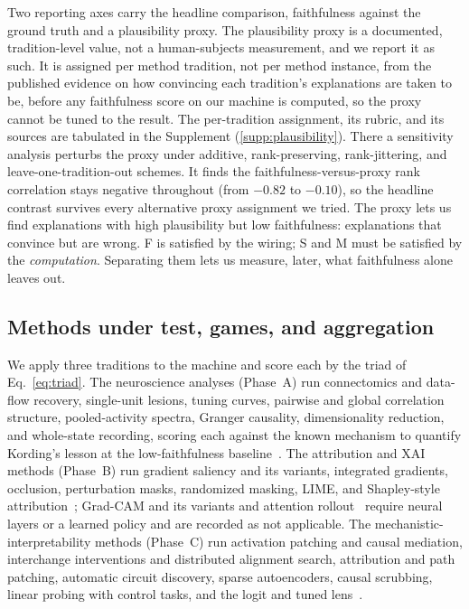 Two reporting axes carry the headline comparison, faithfulness against the ground truth and a
plausibility proxy. The plausibility proxy is a documented, tradition-level value, not a
human-subjects measurement, and we report it as such. It is assigned per method tradition, not
per method instance, from the published evidence on how convincing each tradition's
explanations are taken to be, before any faithfulness score on our machine is computed, so the
proxy cannot be tuned to the result. The per-tradition assignment, its rubric, and its
sources are tabulated in the Supplement (\Sectionname\ref{supp:plausibility}). There a sensitivity
analysis perturbs the proxy under additive, rank-preserving, rank-jittering, and
leave-one-tradition-out schemes. It finds the faithfulness-versus-proxy rank correlation
stays negative throughout (from $-0.82$ to $-0.10$), so the headline contrast survives every
alternative proxy assignment we tried. The proxy lets us find explanations with high
plausibility but low faithfulness: explanations that convince but are wrong. F is satisfied by
the wiring; S and M must be satisfied by the \emph{computation}. Separating them lets us
measure, later, what faithfulness alone leaves out.

\subsection{Methods under test, games, and aggregation}\label{sec:scoring}

We apply three traditions to the machine and score each by the triad of
Eq.~\eqref{eq:triad}. The neuroscience analyses (Phase~A) run connectomics and data-flow
recovery, single-unit lesions, tuning curves, pairwise and global correlation structure,
pooled-activity spectra, Granger causality, dimensionality reduction, and whole-state
recording, scoring each against the known mechanism to quantify Kording's lesson at the
low-faithfulness baseline~\cite{jonas2017could}. The attribution and XAI
methods (Phase~B) run gradient saliency and its variants, integrated gradients, occlusion,
perturbation masks, randomized masking, LIME, and Shapley-style
attribution~\cite{simonyan2014deep,sundararajan2017axiomatic,zeiler2014visualizing,fong2017interpretable,petsiuk2018rise,ribeiro2016why,lundberg2017unified};
Grad-CAM and its variants and attention
rollout~\cite{selvaraju2017gradcam,chattopadhyay2018gradcampp,abnar2020quantifying} require
neural layers or a learned policy and are recorded as not applicable. The
mechanistic-interpretability methods (Phase~C) run activation patching and causal
mediation, interchange interventions and distributed alignment search, attribution and path
patching, automatic circuit discovery, sparse autoencoders, causal scrubbing, linear
probing with control tasks, and the logit and tuned
lens~\cite{vig2020investigating,meng2022locating,geiger2021causal,geiger2023finding,nanda2023attribution,wang2022interpretability,conmy2023towards,cunningham2023sparse,chan2022causal,alain2017understanding,hewitt2019designing,belrose2023eliciting}.

